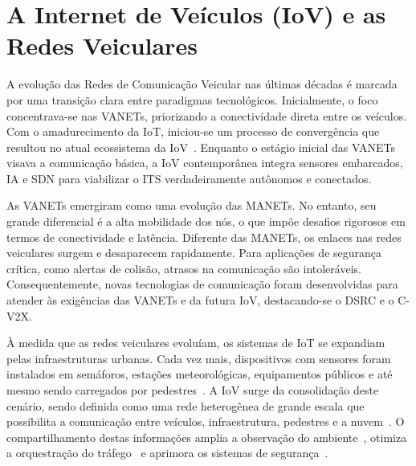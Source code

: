 \section{A Internet de Veículos (\texorpdfstring{\gls{IoV}}{\gls{IoV}}) e as Redes Veiculares}
\label{sec:internet-de-veiculos}

A evolução das Redes de Comunicação Veicular nas últimas décadas é marcada por uma transição clara entre paradigmas tecnológicos. Inicialmente, o foco concentrava-se nas \glspl{VANET}, priorizando a conectividade direta entre os veículos. Com o amadurecimento da \gls{IoT}, iniciou-se um processo de convergência que resultou no atual ecossistema da \gls{IoV}~\cite{salcedo2025_evolution, abd2024comparative}. Enquanto o estágio inicial das \glspl{VANET} visava a comunicação básica, a \gls{IoV} contemporânea integra sensores embarcados, \gls{IA} e \gls{SDN} para viabilizar o \gls{ITS} verdadeiramente autônomos e conectados.

As \glspl{VANET} emergiram como uma evolução das \glspl{MANET}. No entanto, seu grande diferencial é a alta mobilidade dos nós, o que impõe desafios rigorosos em termos de conectividade e latência. Diferente das \glspl{MANET}, os enlaces nas redes veiculares surgem e desaparecem rapidamente. Para aplicações de segurança crítica, como alertas de colisão, atrasos na comunicação são intoleráveis. Consequentemente, novas tecnologias de comunicação foram desenvolvidas para atender às exigências das \glspl{VANET} e da futura \gls{IoV}, destacando-se o \gls{DSRC} e o \gls{C-V2X}.

À medida que as redes veiculares evoluíam, os sistemas de \gls{IoT} se expandiam pelas infraestruturas urbanas. Cada vez mais, dispositivos com sensores foram instalados em semáforos, estações meteorológicas, equipamentos públicos e até mesmo sendo carregados por pedestres~\cite{abd2024comparative}. A \gls{IoV} surge da consolidação deste cenário, sendo definida como uma rede heterogênea de grande escala que possibilita a comunicação entre veículos, infraestrutura, pedestres e a nuvem~\cite{ansari2020v2x}. O compartilhamento destas informações amplia a observação do ambiente~\cite{naik2019evolution}, otimiza a orquestração do tráfego~\cite{sanchez2025evolution} e aprimora os sistemas de segurança~\cite{abd2024comparative}.

